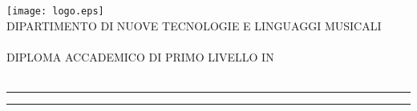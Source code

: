
\begin{titlepage}

\areaset{490pt}{784pt}

  \begin{center}
    {\LARGE
      \texttt{[image: logo.eps]} \\[0.5cm]

      {\normalsize{DIPARTIMENTO DI NUOVE TECNOLOGIE E LINGUAGGI MUSICALI}} \\[-0.2cm]
      {} \\

      {\normalsize{DIPLOMA ACCADEMICO DI PRIMO LIVELLO IN}} \\[-0.2cm]
      {} \\[1.414cm]

      {\huge{\spacedlowsmallcaps{\myName}}}
      \vspace{-0.5cm}
      \par\noindent\rule{\textwidth}{0.4pt}\vspace{0.3cm}
		{\Huge{\color{bbari}\spacedallcaps{\myTitle}}}
      \par\noindent\rule{\textwidth}{0.4pt}\vspace{0.3cm}}
        {\Large{\spacedlowsmallcaps{\mySubTitle}}} \\[.2cm]
	\vfill



\end{center}
\end{titlepage}
